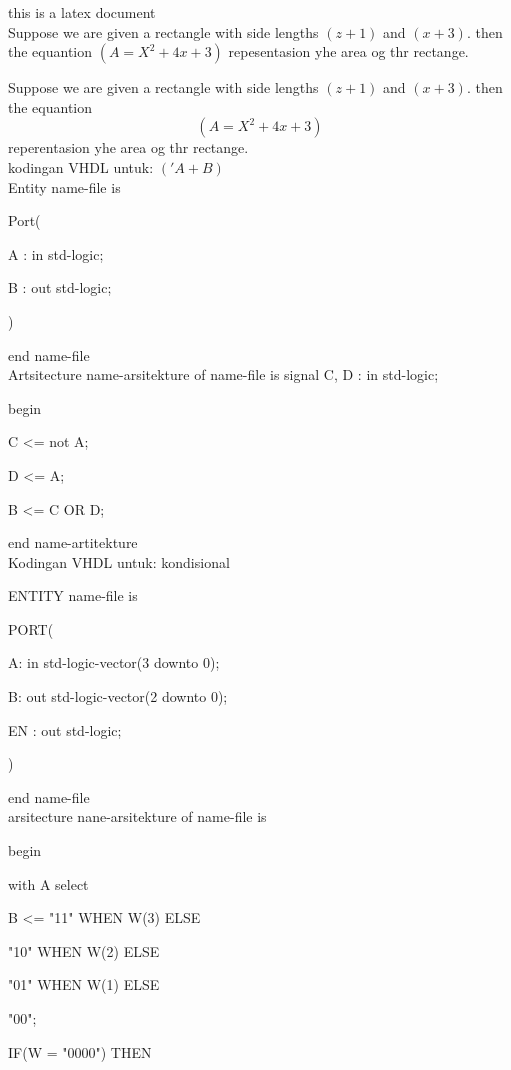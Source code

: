 \documentclass[12pt]{article}
\begin{document}
this is a latex document \\

Suppose we are given a rectangle with side lengths $(z+1)$ and $(x+3)$. then the equantion $(A=X^2+4x+3)$ repesentasion yhe area og thr rectange.

Suppose we are given a rectangle with side lengths $(z+1)$ and $(x+3)$. then the equantion $$(A=X^2+4x+3)$$ reperentasion yhe area og thr rectange. \\

kodingan VHDL untuk: $('A + B)$ \\

Entity name-file is

	Port(
	
		A : in std-logic;
		
		B : out std-logic;
		
		)
		
end name-file \\

Artsitecture name-arsitekture of name-file is
	signal C, D : in std-logic;
	
	begin
		
		C <= not A;
		
		D <= A;
		
		B <= C OR D;
	
	end	name-artitekture \\
	
	\pagebreak
	Kodingan VHDL untuk: kondisional

	ENTITY name-file is
	
		PORT(
		
			A: in std-logic-vector(3 downto 0);
			
			B: out std-logic-vector(2 downto 0);
			
			EN : out std-logic;
			
		)
		
	end name-file \\
	
	arsitecture nane-arsitekture of name-file is
		
		begin
		
			with A select
			
				B <= "11" WHEN W(3) ELSE
				
					 "10" WHEN W(2) ELSE
					 
					 "01" WHEN W(1) ELSE
					 
					 "00";
					 				
				IF(W = "0000") THEN
				
\end{document}
